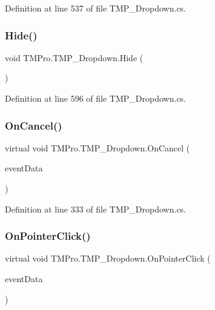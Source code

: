 Definition at line 537 of file T\+M\+P\+\_\+\+Dropdown.\+cs.

\mbox{\label{class_t_m_pro_1_1_t_m_p___dropdown_a7b1a625bbfae2222ce459deb2df40afd}} 
\subsubsection{\texorpdfstring{Hide()}{Hide()}}
{\footnotesize\ttfamily void T\+M\+Pro.\+T\+M\+P\+\_\+\+Dropdown.\+Hide (\begin{DoxyParamCaption}{ }\end{DoxyParamCaption})}



Definition at line 596 of file T\+M\+P\+\_\+\+Dropdown.\+cs.

\mbox{\label{class_t_m_pro_1_1_t_m_p___dropdown_aa645c81e1d5c8ddaef20c6fcb1d77345}} 
\subsubsection{\texorpdfstring{OnCancel()}{OnCancel()}}
{\footnotesize\ttfamily virtual void T\+M\+Pro.\+T\+M\+P\+\_\+\+Dropdown.\+On\+Cancel (\begin{DoxyParamCaption}\item[{Base\+Event\+Data}]{event\+Data }\end{DoxyParamCaption})\hspace{0.3cm}{\ttfamily [virtual]}}



Definition at line 333 of file T\+M\+P\+\_\+\+Dropdown.\+cs.

\mbox{\label{class_t_m_pro_1_1_t_m_p___dropdown_a4694d50db9f52ecc96cb8dc27ea9f8e3}} 
\subsubsection{\texorpdfstring{OnPointerClick()}{OnPointerClick()}}
{\footnotesize\ttfamily virtual void T\+M\+Pro.\+T\+M\+P\+\_\+\+Dropdown.\+On\+Pointer\+Click (\begin{DoxyParamCaption}\item[{Pointer\+Event\+Data}]{event\+Data }\end{DoxyParamCaption})\hspace{0.3cm}{\ttfamily [virtual]}}



